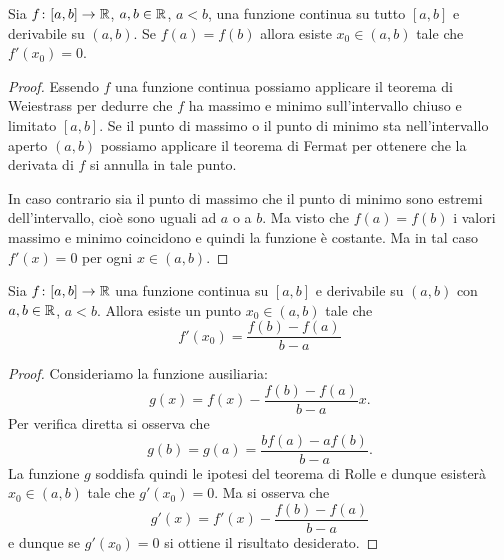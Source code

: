 \begin{theorem}[Rolle]
\mymark{***}
%
Sia $f\colon [a,b]\to {\mathbb R}$, $a,b\in {\mathbb R}$, $a<b$, una funzione continua su tutto $[a,b]$ e derivabile su $(a,b)$.
%
Se $f(a) = f(b)$ allora esiste $x_0 \in (a,b)$ tale che $f'(x_0)=0$.
\end{theorem}
%
\begin{proof}
\mymark{***}
Essendo $f$ una funzione continua
possiamo applicare il teorema di Weiestrass per dedurre che $f$ ha massimo e 
minimo sull'intervallo chiuso e limitato $[a,b]$. 
Se il punto di massimo o il punto di minimo sta nell'intervallo aperto 
$(a,b)$ possiamo applicare il teorema di Fermat per ottenere che la derivata 
di $f$ si annulla in tale punto.

In caso contrario sia il punto di massimo che il punto di minimo sono estremi 
dell'intervallo, cioè sono uguali ad $a$ o a $b$. Ma visto che $f(a)=f(b)$ 
i valori massimo e minimo coincidono e quindi la funzione è costante. 
Ma in tal caso $f'(x)=0$ per ogni $x\in (a,b)$.
\end{proof}

\begin{theorem}[Lagrange]\label{th:lagrange}%
\mymark{***}%
%
%
%
Sia $f\colon [a,b]\to {\mathbb R}$ una funzione continua su $[a,b]$ e derivabile su $(a,b)$
con $a,b\in {\mathbb R}$, $a<b$.
%
Allora esiste un punto $x_0\in (a,b)$ tale che
\[
  f'(x_0) = \frac{f(b) - f(a)}{b-a}
\]
\end{theorem}
%
\begin{proof}
\mymark{***}
Consideriamo la funzione ausiliaria:
\[
  g(x) = f(x) - \frac{f(b)-f(a)}{b-a} x.
\]
Per verifica diretta si osserva che
\[
  g(b) = g(a) = \frac{b f(a) - a f(b)}{b-a}.
\]
La funzione $g$ soddisfa quindi le ipotesi del teorema di Rolle e dunque esisterà $x_0\in (a,b)$ tale che $g'(x_0)=0$.
Ma si osserva che
\[
  g'(x) = f'(x) - \frac{f(b)-f(a)}{b-a}
\]
e dunque se $g'(x_0)=0$ si ottiene il risultato desiderato.
\end{proof}


